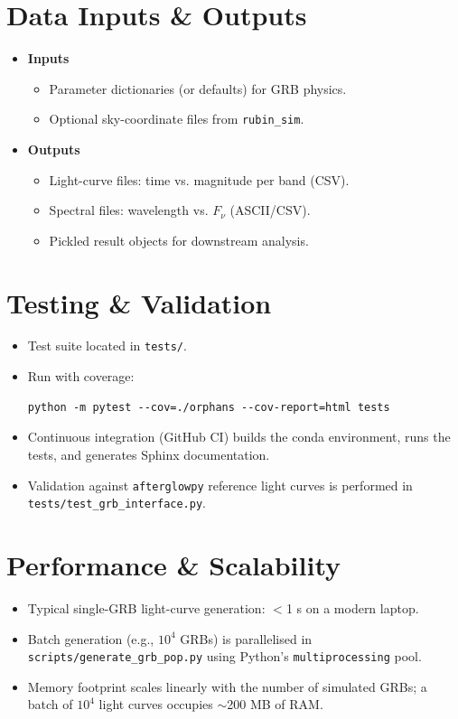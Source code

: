 \documentclass{article}
\begin{document}
\section*{Data Inputs \& Outputs}
\begin{itemize}
  \item \textbf{Inputs}
    \begin{itemize}
      \item Parameter dictionaries (or defaults) for GRB physics.
      \item Optional sky-coordinate files from \texttt{rubin\_sim}.
    \end{itemize}
  \item \textbf{Outputs}
    \begin{itemize}
      \item Light-curve files: time vs. magnitude per band (CSV).
      \item Spectral files: wavelength vs. $F_{\nu}$ (ASCII/CSV).
      \item Pickled result objects for downstream analysis.
    \end{itemize}
\end{itemize}

\section*{Testing \& Validation}
\begin{itemize}
  \item Test suite located in \texttt{tests/}.
  \item Run with coverage:
\begin{verbatim}
python -m pytest --cov=./orphans --cov-report=html tests
\end{verbatim}
  \item Continuous integration (GitHub CI) builds the conda environment, runs the tests, and generates Sphinx documentation.
  \item Validation against \texttt{afterglowpy} reference light curves is performed in \texttt{tests/test\_grb\_interface.py}.
\end{itemize}

\section*{Performance \& Scalability}
\begin{itemize}
  \item Typical single-GRB light-curve generation: $<$1 s on a modern laptop.
  \item Batch generation (e.g., $10^{4}$ GRBs) is parallelised in \texttt{scripts/generate\_grb\_pop.py} using Python’s \texttt{multiprocessing} pool.
  \item Memory footprint scales linearly with the number of simulated GRBs; a batch of $10^{4}$ light curves occupies $\sim$200 MB of RAM.
\end{itemize}
\end{document}
